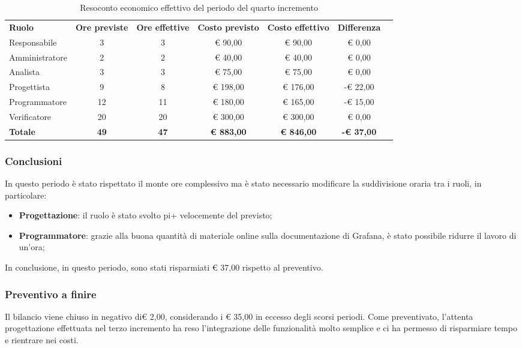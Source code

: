 \documentclass[../piano-di-progetto.tex]{subfiles}
\begin{document}
  \begin{table}[H]
    \centering
    \begin{tabular}{lcccccc}
      \rowcolor{lightgray}
      \textbf{Ruolo}  & \textbf{Ore previste} & \textbf{Ore effettive} & \textbf{Costo previsto} & \textbf{Costo effettivo} & \textbf{Differenza} \\
Responsabile    & 3           & 3           & € 90,00           & € 90,00            & € 0,00            \\
Amministratore  & 2           & 2           & € 40,00           & € 40,00            & € 0,00            \\
Analista        & 3           & 3           & € 75,00           & € 75,00            & € 0,00            \\
Progettista     & 9           & 8           & € 198,00          & € 176,00          & -€ 22,00          \\
Programmatore   & 12          & 11          & € 180,00          & € 165,00          & -€ 15,00          \\
Verificatore    & 20          & 20          & € 300,00          & € 300,00            & € 0,00            \\
\textbf{Totale} & \textbf{49} & \textbf{47} & \textbf{€ 883,00} & \textbf{€ 846,00} & \textbf{-€ 37,00}

    \end{tabular}
    \caption{Resoconto economico effettivo del periodo del quarto incremento}
  \end{table}


\subsubsection{Conclusioni}
In questo periodo è stato rispettato il monte ore complessivo ma è stato necessario modificare la suddivisione oraria tra i ruoli, in particolare:
\begin{itemize}
    \item \textbf{Progettazione}: il ruolo è stato svolto pi+ velocemente del previsto;
    \item \textbf{Programmatore}: grazie alla buona quantità di materiale online sulla documentazione di Grafana, è stato possibile ridurre il lavoro di un'ora;
\end{itemize}
In conclusione, in questo periodo, sono stati risparmiati € 37,00 rispetto al preventivo.

\subsubsection{Preventivo a finire}
Il bilancio viene chiuso in negativo di€ 2,00, considerando i € 35,00 in eccesso degli scorsi periodi. Come preventivato, l'attenta progettazione effettuata nel terzo incremento ha reso l'integrazione delle funzionalità molto semplice e ci ha permesso di risparmiare tempo e rientrare nei costi. 
\end{document}
